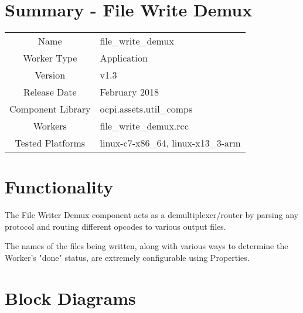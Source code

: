 \documentclass{article}
\author{} %
\date{Version \docVersion} %
\title{\docTitle}
\def\docVersion{1.3}
\def\comp{file\_write\_demux}
\def\Comp{File Write Demux}
\begin{document}
\section*{Summary - \Comp}
\begin{tabular}{|c|M{13.5cm}|}
  \hline
                    &                            \\
  \hline
  Name              & \comp                      \\
  \hline
	Worker Type       & Application                \\
  \hline
	Version           & v\docVersion \\
  \hline
	Release Date      & February 2018 \\
  \hline
  Component Library & ocpi.assets.util\_comps     \\
  \hline
  Workers           & \comp.rcc                  \\
  \hline
  Tested Platforms  & linux-c7-x86\_64, linux-x13\_3-arm \\
  \hline
\end{tabular}
\section*{Functionality}
\begin{flushleft}
	The File Writer Demux component acts as a demultiplexer/router by parsing any protocol and routing different opcodes to various output files.\par\medskip
	The names of the files being written, along with various ways to determine the Worker's "done" status, are extremely configurable using Properties.
\end{flushleft}

\section*{Block Diagrams}
\end{document}
